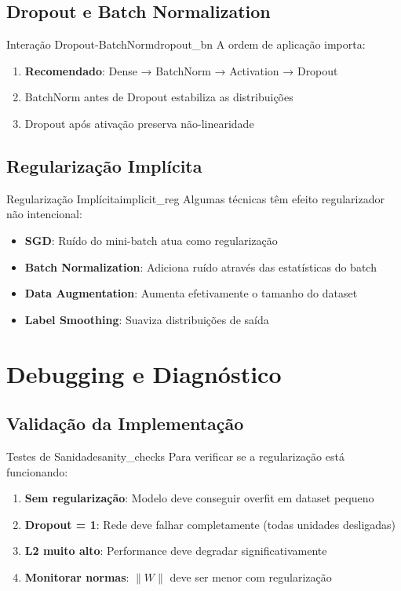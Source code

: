 \documentclass[a4paper,12pt]{article}
\begin{document}
\subsection{Dropout e Batch Normalization}

\begin{observacao}{Interação Dropout-BatchNorm}{dropout_bn}
A ordem de aplicação importa:
\begin{enumerate}
    \item \textbf{Recomendado}: Dense → BatchNorm → Activation → Dropout
    \item BatchNorm antes de Dropout estabiliza as distribuições
    \item Dropout após ativação preserva não-linearidade
\end{enumerate}
\end{observacao}

\subsection{Regularização Implícita}

\begin{definicao}{Regularização Implícita}{implicit_reg}
Algumas técnicas têm efeito regularizador não intencional:
\begin{itemize}
    \item \textbf{SGD}: Ruído do mini-batch atua como regularização
    \item \textbf{Batch Normalization}: Adiciona ruído através das estatísticas do batch
    \item \textbf{Data Augmentation}: Aumenta efetivamente o tamanho do dataset
    \item \textbf{Label Smoothing}: Suaviza distribuições de saída
\end{itemize}
\end{definicao}

\section{Debugging e Diagnóstico}

\subsection{Validação da Implementação}

\begin{observacao}{Testes de Sanidade}{sanity_checks}
Para verificar se a regularização está funcionando:
\begin{enumerate}
    \item \textbf{Sem regularização}: Modelo deve conseguir overfit em dataset pequeno
    \item \textbf{Dropout = 1}: Rede deve falhar completamente (todas unidades desligadas)
    \item \textbf{L2 muito alto}: Performance deve degradar significativamente
    \item \textbf{Monitorar normas}: $\|W\|$ deve ser menor com regularização
\end{enumerate}
\end{observacao}
\end{document}
